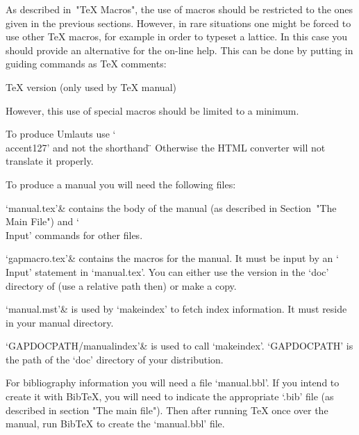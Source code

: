 


As  described in~"TeX Macros", the use of  macros should be restricted to
the ones given in the previous sections.  However, in rare situations one
might be forced to use other {\TeX} macros,
for example  in order  to  typeset a lattice.
In this case you should provide an alternative for the on-line help.
This can be done by putting in guiding commands as {\TeX} comments:

\begintt
TeX version (only used by TeX manual)
\endtt

However, this use of special macros should be limited to a minimum.

To produce Umlauts use `\\accent127' and not the shorthand
\beginverbatim
\"
\endverbatim
Otherwise the HTML converter will not translate it properly.


To produce a manual you will need the following files:

\beginitems
`manual.tex'&
    contains the body of the manual
    (as described in Section~"The Main File")
    and `\\Input' commands for other files.

`gapmacro.tex'&
    contains the macros for the manual.
    It must be input by an `\\Input' statement in `manual.tex'.
    You can either use the version in the `doc' directory of {\GAP}
    (use a relative path then) or make a copy.

`manual.mst'&
    is used by `makeindex' to fetch index information.
    It must reside in your manual directory.

`GAPDOCPATH/manualindex'&
    is used to call `makeindex'.
    `GAPDOCPATH' is the path of the `doc' directory of your {\GAP}
    distribution.
\enditems

For bibliography information you will need a file `manual.bbl'. If you
intend to create it with Bib{\TeX}, you will need to indicate the
appropriate `.bib' file (as described in section "The main file"). Then
after running {\TeX} once over the manual, run Bib{\TeX} to create the
`manual.bbl' file.

